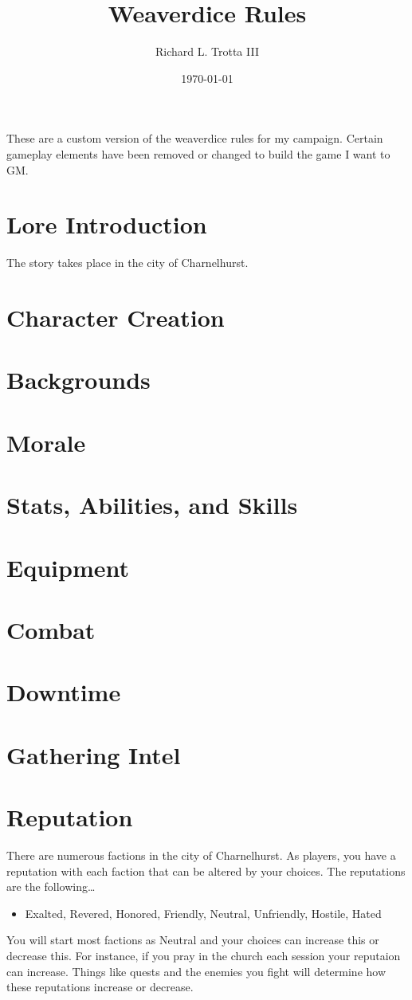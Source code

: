 \documentclass[11pt]{article}
\author{Richard L. Trotta III}
\date{\today}
\title{Weaverdice Rules}
\begin{document}
\maketitle
These are a custom version of the weaverdice rules for my campaign. Certain gameplay elements have been removed or changed to build the game I want to GM.

\section*{Lore Introduction}
\label{sec:orgfb178f3}

The story takes place in the city of Charnelhurst.

\section*{Character Creation}
\label{sec:org6fb2b4d}
\section*{Backgrounds}
\label{sec:orgebd748f}
\section*{Morale}
\label{sec:orge216853}
\section*{Stats, Abilities, and Skills}
\label{sec:orgc593ad1}
\section*{Equipment}
\label{sec:org06b820d}
\section*{Combat}
\label{sec:org5b4a69d}
\section*{Downtime}
\label{sec:org2668cfd}
\section*{Gathering Intel}
\label{sec:orgb91f2ff}
\section*{Reputation}
\label{sec:org4571a0d}

There are numerous factions in the city of Charnelhurst. As players, you have a reputation with each faction that can be altered by your choices. The reputations are the following\ldots{}

\begin{itemize}
\item Exalted, Revered, Honored, Friendly, Neutral, Unfriendly, Hostile, Hated
\end{itemize}

You will start most factions as Neutral and your choices can increase this or decrease this. For instance, if you pray in the church each session your reputaion can increase. Things like quests and the enemies you fight will determine how these reputations increase or decrease. 
\end{document}
